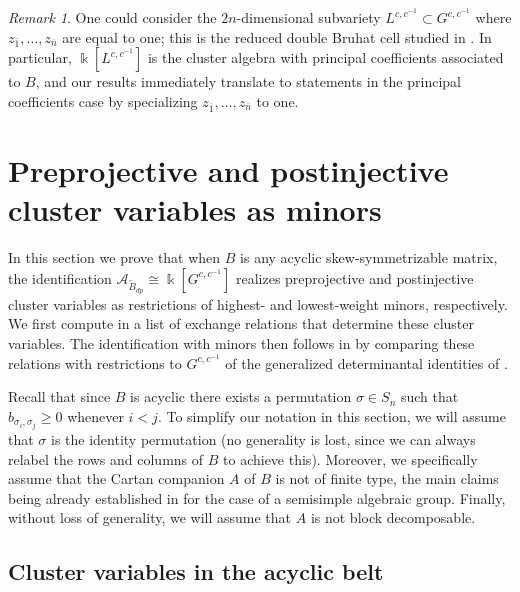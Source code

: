 \documentclass[12pt]{amsart}
\newcommand{\cA}{\mathcal{A}}
\newcommand{\kk}{\Bbbk}
\newcommand{\bfc}{\mathbf{c}}
\newcommand{\bfg}{\mathbf{g}}
\newcommand{\ol}[1]{\overline{#1}}
\newcommand{\Bdp}{\widetilde{B}_{dp}}
\newcommand{\cvar}{z}
\theoremstyle{remark}
\newtheorem{remark}[theorem]{Remark}
\numberwithin{equation}{section}
\numberwithin{figure}{section}
\begin{document}
\begin{remark}
  One could consider the $2n$-dimensional subvariety $L^{c,c^{-1}} \subset G^{c,c^{-1}}$ where $z_{\ol{1}},\dotsc,z_{\ol{n}}$ are equal to one; this is the reduced double Bruhat cell studied in \cite{YZ08}.
  In particular, $\kk[L^{c,c^{-1}}]$ is the cluster algebra with principal coefficients associated to $B$, and our results immediately translate to statements in the principal coefficients case by specializing $\cvar_{\ol{1}},\dotsc,\cvar_{\ol{n}}$ to one.
\end{remark}

\section{Preprojective and postinjective cluster variables as minors}\label{sec:preproj}
In this section we prove that when $B$ is any acyclic skew-symmetrizable matrix, the identification $\cA_{\Bdp} \cong \kk[G^{c,c^{-1}}]$ realizes preprojective and postinjective cluster variables as restrictions of highest- and lowest-weight minors, respectively. 
We first compute in  a list of exchange relations that determine these cluster variables. 
The identification with minors then follows in  by comparing these relations with restrictions  to $G^{c,c^{-1}}$ of the generalized determinantal identities of .


Recall that since $B$ is acyclic there exists a permutation $\sigma\in S_n$ such that $b_{\sigma_i,\sigma_j}\geq 0$ whenever $i<j$.
To simplify our notation in this section, we will assume that $\sigma$ is the identity permutation (no generality is lost, since we can always relabel the rows and columns of $B$ to achieve this). Moreover, we specifically assume that the Cartan companion $A$ of $B$ is not of finite type, the main claims being already established in \cite{YZ08} for the case of a semisimple algebraic group.
Finally, without loss of generality, we will assume that $A$ is not block decomposable.

\subsection{Cluster variables in the acyclic belt}
\label{sec:acyclic_belt}
\end{document}
